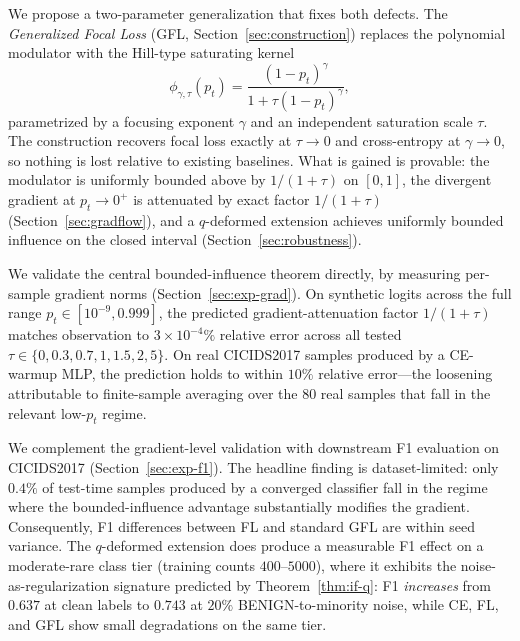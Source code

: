\documentclass[conference]{IEEEtran}
\theoremstyle{definition}
\begin{document}
We propose a two-parameter generalization that fixes both defects. The \emph{Generalized Focal Loss} (GFL, Section~\ref{sec:construction}) replaces the polynomial modulator with the Hill-type saturating kernel
\[
\phi_{\gamma,\tau}(p_t) = \frac{(1-p_t)^\gamma}{1+\tau(1-p_t)^\gamma},
\]
parametrized by a focusing exponent $\gamma$ and an independent saturation scale $\tau$. The construction recovers focal loss exactly at $\tau \to 0$ and cross-entropy at $\gamma \to 0$, so nothing is lost relative to existing baselines. What is gained is provable: the modulator is uniformly bounded above by $1/(1+\tau)$ on $[0,1]$, the divergent gradient at $p_t \to 0^+$ is attenuated by exact factor $1/(1+\tau)$ (Section~\ref{sec:gradflow}), and a $q$-deformed extension achieves uniformly bounded influence on the closed interval (Section~\ref{sec:robustness}).

We validate the central bounded-influence theorem directly, by measuring per-sample gradient norms (Section~\ref{sec:exp-grad}). On synthetic logits across the full range $p_t \in [10^{-9}, 0.999]$, the predicted gradient-attenuation factor $1/(1+\tau)$ matches observation to $3 \times 10^{-4}\%$ relative error across all tested $\tau \in \{0, 0.3, 0.7, 1, 1.5, 2, 5\}$. On real CICIDS2017 samples produced by a CE-warmup MLP, the prediction holds to within $10\%$ relative error---the loosening attributable to finite-sample averaging over the 80 real samples that fall in the relevant low-$p_t$ regime.

We complement the gradient-level validation with downstream F1 evaluation on CICIDS2017 (Section~\ref{sec:exp-f1}). The headline finding is dataset-limited: only $0.4\%$ of test-time samples produced by a converged classifier fall in the regime where the bounded-influence advantage substantially modifies the gradient. Consequently, F1 differences between FL and standard GFL are within seed variance. The $q$-deformed extension does produce a measurable F1 effect on a moderate-rare class tier (training counts $400$--$5000$), where it exhibits the noise-as-regularization signature predicted by Theorem~\ref{thm:if-q}: F1 \emph{increases} from $0.637$ at clean labels to $0.743$ at $20\%$ BENIGN-to-minority noise, while CE, FL, and GFL show small degradations on the same tier.
\end{document}
